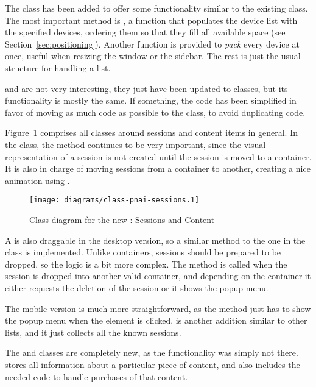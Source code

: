 The  class has been added to offer some functionality similar to the existing  class.
The most important method is , a function that populates the device list with the specified devices, ordering them so that they fill all available space (see Section~\ref{sec:positioning}).
Another function is provided to \emph{pack} every device at once, useful when resizing the window or the sidebar.
The rest is just the usual structure for handling a list.

 and  are not very interesting, they just have been updated to  classes, but its functionality is mostly the same.
If something, the code has been simplified in favor of moving as much code as possible to the  class, to avoid duplicating code.

Figure~\ref{fig:class-pnai-sessions} comprises all classes around sessions and content items in general.
In the  class, the  method continues to be very important, since the visual representation of a session is not created until the session is moved to a container.
It is also in charge of moving sessions from a container to another, creating a nice animation using .

\begin{figure}[htbp]
  \centering
    \texttt{[image: diagrams/class-pnai-sessions.1]}
  \caption{Class diagram for the new : Sessions and Content}
  \label{fig:class-pnai-sessions}
\end{figure}

A  is also draggable in the desktop version, so a similar method to the one in the  class is implemented.
Unlike containers, sessions should be prepared to be dropped, so the logic is a bit more complex.
The  method is called when the session is dropped into another valid container, and depending on the container it either requests the deletion of the session or it shows the popup menu.

The mobile version is much more straightforward, as the  method just has to show the popup menu when the element is clicked.
 is another addition similar to other lists, and it just collects all the known sessions.

The  and  classes are completely new, as the functionality was simply not there.
 stores all information about a particular piece of content, and also includes the needed code to handle purchases of that content.

